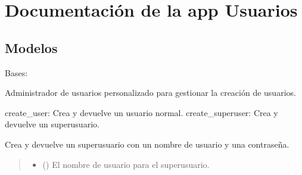 \documentclass[letterpaper,10pt,spanish]{sphinxmanual}
\begin{document}
\sphinxstepscope


\chapter{Documentación de la app Usuarios}
\label{\detokenize{usuarios:documentacion-de-la-app-usuarios}}\label{\detokenize{usuarios::doc}}

\section{Modelos}
\label{\detokenize{usuarios:modelos}}

\begin{fulllineitems}

\pysigstartsignatures
{}
\pysigstopsignatures
\sphinxAtStartPar
Bases: 

\sphinxAtStartPar
Administrador de usuarios personalizado para gestionar la creación de usuarios.
\begin{description}
\sphinxAtStartPar
create\_user: Crea y devuelve un usuario normal.
create\_superuser: Crea y devuelve un superusuario.

\end{description}


\begin{fulllineitems}

\pysigstartsignatures
{}
\pysigstopsignatures
\sphinxAtStartPar
Crea y devuelve un superusuario con un nombre de usuario y una contraseña.
\begin{quote}\begin{description}
\begin{itemize}
\item {} 
\sphinxAtStartPar
{} () \textendash{} El nombre de usuario para el superusuario.


\end{itemize}
\end{description}
\end{quote}
\end{fulllineitems}
\end{fulllineitems}
\end{document}
